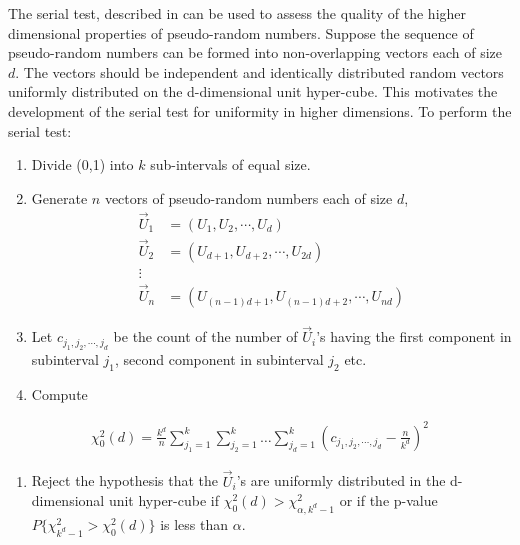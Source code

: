 \documentclass[
]{book}
\providecommand{\tightlist}{%
  \setlength{\itemsep}{0pt}\setlength{\parskip}{0pt}}
\theoremstyle{definition}
\theoremstyle{definition}
\theoremstyle{definition}
\theoremstyle{definition}
\theoremstyle{remark}
\begin{document}
The serial test, described in \citep{law2007simulation} can be used to assess
the quality of the higher dimensional properties of pseudo-random
numbers. Suppose the sequence of pseudo-random numbers can be formed
into non-overlapping vectors each of size \(d\). The vectors should be
independent and identically distributed random vectors uniformly
distributed on the d-dimensional unit hyper-cube. This motivates the
development of the serial test for uniformity in higher dimensions. To
perform the serial test:

\begin{enumerate}
\def\labelenumi{\arabic{enumi}.}
\item
  Divide (0,1) into \(k\) sub-intervals of equal size.
\item
  Generate \(n\) vectors of pseudo-random numbers each of size \(d\),
  \[
  \begin{aligned}
  \vec{U}_{1} & = (U_{1}, U_{2}, \cdots, U_{d})\\
  \vec{U}_{2} & = (U_{d+1}, U_{d+2}, \cdots, U_{2d})\\
  \vdots \\
  \vec{U}_{n} & = (U_{(n-1)d+1}, U_{(n-1)d+2}, \cdots, U_{nd})
  \end{aligned}
  \]
\item
  Let \(c_{j_{1}, j_{2}, \cdots, j_{d}}\) be the count of the number of \(\vec{U}_{i}\)'s
  having the first component in subinterval \(j_{1}\), second component
  in subinterval \(j_{2}\) etc.
\item
  Compute
\end{enumerate}

\begin{equation}
\begin{aligned}
    \chi^{2}_{0}(d) = \frac{k^{d}}{n}\sum\limits_{j_{1}=1}^{k} \sum\limits_{j_{2}=1}^{k} \dotso \sum\limits_{j_{d}=1}^{k} \left( c_{j_{1}, j_{2}, \cdots, j_{d}} - \frac{n}{k^{d}} \right)^{2}
\end{aligned}
\label{eq:chisqU01Dim}
\end{equation}

\begin{enumerate}
\def\labelenumi{\arabic{enumi}.}
\setcounter{enumi}{4}
\tightlist
\item
  Reject the hypothesis that the \(\vec{U}_{i}\)'s are uniformly
  distributed in the d-dimensional unit hyper-cube if
  \(\chi^{2}_{0}(d) > \chi^{2}_{\alpha, k^{d}-1}\) or if the p-value
  \(P\{\chi^{2}_{k^{d}-1} > \chi^{2}_{0}(d)\}\) is less than \(\alpha\).
\end{enumerate}
\end{document}
